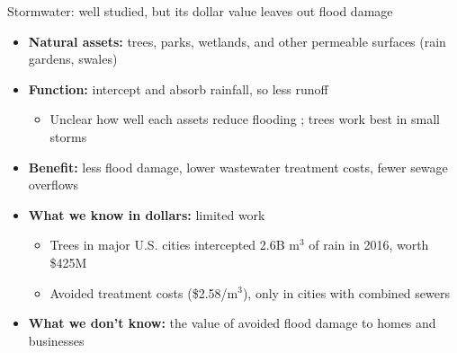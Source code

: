 \documentclass[aspectratio=169]{beamer}
\newcommand{\smallcite}[1]{\begingroup\scriptsize\citep{#1}\endgroup}
\begin{document}
\begin{frame}{Stormwater: well studied, but its dollar value leaves out flood damage}
    \small
    \begin{itemize}
        \item \textbf{Natural assets:} trees, parks, wetlands, and other permeable surfaces (rain gardens, swales)
        \item \textbf{Function:} intercept and absorb rainfall, so less runoff \smallcite{veerkampReviewStudiesAssessing2021,herisPilotingUrbanEcosystem2021}
        \begin{itemize}
            \item Unclear how well each assets reduce flooding \smallcite{diepEmpoweringCitiesGlobally2025}; trees work best in small storms \smallcite{herisPilotingUrbanEcosystem2021}
        \end{itemize}
        \item \textbf{Benefit:} less flood damage, lower wastewater treatment costs, fewer sewage overflows
        \item \textbf{What we know in dollars:} limited work
        \begin{itemize}
            \item Trees in major U.S. cities intercepted 2.6B m$^3$ of rain in 2016, worth \$425M \smallcite{herisPilotingUrbanEcosystem2021}
            \item Avoided treatment costs (\$2.58/m$^3$), only in cities with combined sewers
        \end{itemize}
        \item \textbf{What we don't know:} the value of avoided flood damage to homes and businesses
    \end{itemize}
\end{frame}
\end{document}
